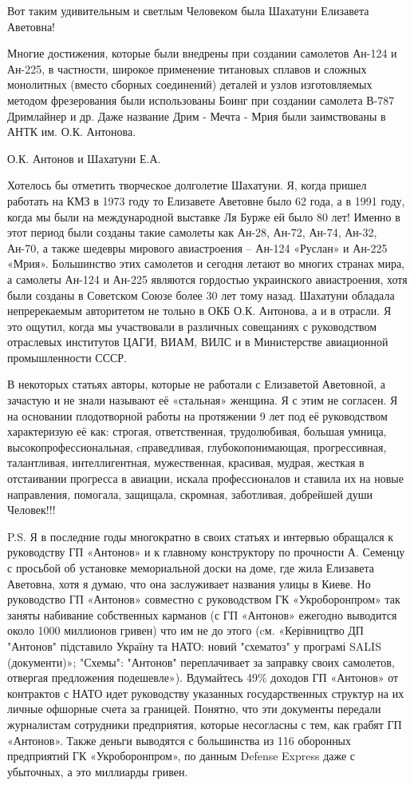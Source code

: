 Вот таким удивительным и светлым Человеком была Шахатуни Елизавета Аветовна!

Многие достижения, которые были внедрены при создании самолетов Ан-124 и
Ан-225, в частности, широкое применение титановых сплавов и сложных монолитных
(вместо сборных соединений) деталей и узлов изготовляемых методом фрезерования
были использованы Боинг при создании самолета В-787 Дримлайнер и др. Даже
название Дрим - Мечта - Мрия были заимствованы в АНТК им. О.К. Антонова.

О.К. Антонов и Шахатуни Е.А.

Хотелось бы отметить творческое долголетие Шахатуни. Я, когда пришел работать
на КМЗ в 1973 году то Елизавете Аветовне было 62 года, а в 1991 году, когда мы
были на международной выставке Ля Бурже ей было 80 лет! Именно в этот период
были созданы такие самолеты как Ан-28, Ан-72, Ан-74, Ан-32, Ан-70, а также
шедевры мирового авиастроения – Ан-124 «Руслан» и Ан-225 «Мрия». Большинство
этих самолетов и сегодня летают во многих странах мира, а самолеты Ан-124 и
Ан-225 являются гордостью украинского авиастроения, хотя были созданы в
Советском Союзе более 30 лет тому назад. Шахатуни обладала непререкаемым
авторитетом не тольно в ОКБ О.К. Антонова, а и в отрасли. Я это ощутил, когда
мы участвовали в различных совещаниях с руководством отраслевых институтов
ЦАГИ, ВИАМ, ВИЛС и в Министерстве авиационной промышленности СССР.

В некоторых статьях авторы, которые не работали с Елизаветой Аветовной, а
зачастую и не знали называют её «стальная» женщина. Я с этим не согласен. Я на
основании плодотворной работы на протяжении 9 лет под её руководством
характеризую её как: строгая, ответственная, трудолюбивая, большая умница,
высокопрофессиональная, cправедливая, глубокопонимающая, прогрессивная,
талантливая, интеллигентная, мужественная, красивая, мудрая, жесткая в
отстаивании прогресса в авиации, искала профессионалов и ставила их на новые
направления, помогала, защищала, скромная, заботливая, добрейшей души
Человек!!!

P.S. Я в последние годы многократно в своих статьях и интервью обращался к
руководству ГП «Антонов» и к главному конструктору по прочности А. Семенцу с
просьбой об установке мемориальной доски на доме, где жила Елизавета Аветовна,
хотя я думаю, что она заслуживает названия улицы в Киеве. Но руководство ГП
«Антонов» совместно с руководством ГК «Укроборонпром» так заняты набивание
собственных карманов (с ГП «Антонов» ежегодно выводится около 1000 миллионов
гривен) что им не до этого (cм. «Керівництво ДП "Антонов" підставило Україну та
НАТО: новий "схематоз" у програмі SALIS (документи)»; "Схемы": "Антонов"
переплачивает за заправку своих самолетов, отвергая предложения подешевле»).
Вдумайтесь 49\% доходов ГП «Антонов» от контрактов с НАТО идет руководству
указанных государственных структур на их личные офшорные счета за границей.
Понятно, что эти документы передали журналистам сотрудники предприятия, которые
несогласны с тем, как грабят ГП «Антонов». Также деньги выводятся с большинства
из 116 оборонных предприятий ГК «Укроборонпром», по данным Defense Express даже
с убыточных, а это миллиарды гривен.

